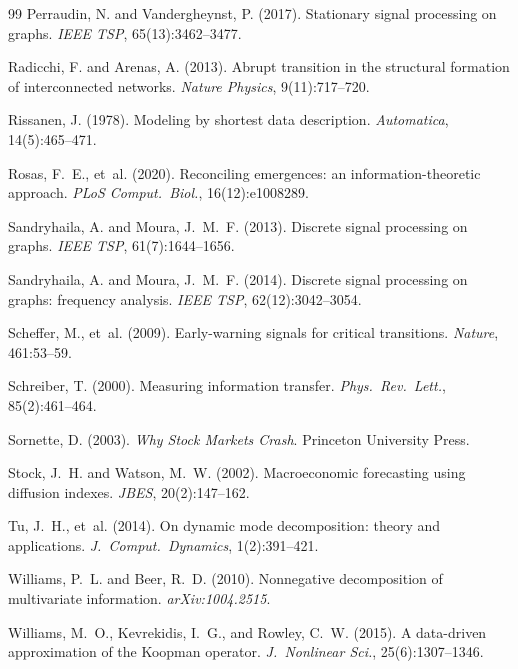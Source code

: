 \documentclass[11pt,a4paper]{article}
\theoremstyle{definition}
\begin{document}
\begin{thebibliography}{99}
Perraudin, N. and Vandergheynst, P. (2017). Stationary signal processing on graphs. \emph{IEEE TSP}, 65(13):3462--3477.

Radicchi, F. and Arenas, A. (2013). Abrupt transition in the structural formation of interconnected networks. \emph{Nature Physics}, 9(11):717--720.

Rissanen, J. (1978). Modeling by shortest data description. \emph{Automatica}, 14(5):465--471.

Rosas, F.~E., et~al. (2020). Reconciling emergences: an information-theoretic approach. \emph{PLoS Comput.\ Biol.}, 16(12):e1008289.

Sandryhaila, A. and Moura, J.~M.~F. (2013). Discrete signal processing on graphs. \emph{IEEE TSP}, 61(7):1644--1656.

Sandryhaila, A. and Moura, J.~M.~F. (2014). Discrete signal processing on graphs: frequency analysis. \emph{IEEE TSP}, 62(12):3042--3054.

Scheffer, M., et~al. (2009). Early-warning signals for critical transitions. \emph{Nature}, 461:53--59.

Schreiber, T. (2000). Measuring information transfer. \emph{Phys.\ Rev.\ Lett.}, 85(2):461--464.

Sornette, D. (2003). \emph{Why Stock Markets Crash}. Princeton University Press.

Stock, J.~H. and Watson, M.~W. (2002). Macroeconomic forecasting using diffusion indexes. \emph{JBES}, 20(2):147--162.

Tu, J.~H., et~al. (2014). On dynamic mode decomposition: theory and applications. \emph{J.\ Comput.\ Dynamics}, 1(2):391--421.

Williams, P.~L. and Beer, R.~D. (2010). Nonnegative decomposition of multivariate information. \emph{arXiv:1004.2515}.

Williams, M.~O., Kevrekidis, I.~G., and Rowley, C.~W. (2015). A data-driven approximation of the Koopman operator. \emph{J.\ Nonlinear Sci.}, 25(6):1307--1346.


\end{thebibliography}
\end{document}
